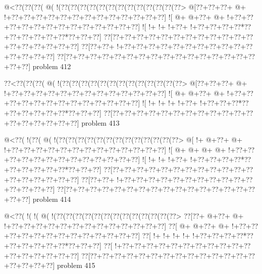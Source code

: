 \vbox{\vbox{\goo
\- @<\0??(\0??(\0??(\- @(\- !(\0??(\0??(\0??(\0??(\0??(\0??(\0??(\0??(\0??(\0??(\0??(\0??(\0??>
\- @[\0??+\0??+\0??+\- @+\- !+\0??+\0??+\0??+\0??+\0??+\0??+\0??+\0??+\0??+\0??+\0??+\0??+\0??]
\- ![\- @+\- @+\0??+\- @+\- !+\0??+\0??+\0??+\0??+\0??+\0??+\0??+\0??+\0??+\0??+\0??+\0??+\0??]
\- ![\- !+\- !+\- !+\0??+\- !+\0??+\0??+\0??+\0??*\0??+\0??+\0??+\0??+\0??+\0??*\0??+\0??+\0??]
\0??[\0??+\0??+\0??+\0??+\0??+\0??+\0??+\0??+\0??+\0??+\0??+\0??+\0??+\0??+\0??+\0??+\0??+\0??]
\0??[\0??+\0??+\- !+\0??+\0??+\0??+\0??+\0??+\0??+\0??+\0??+\0??+\0??+\0??+\0??+\0??+\0??+\0??]
\0??[\0??+\0??+\0??+\0??+\0??+\0??+\0??+\0??+\0??+\0??+\0??+\0??+\0??+\0??+\0??+\0??+\0??+\0??]
}
\hfil problem 412\hfil\break
}



\vbox{\vbox{\goo
\0??<\0??(\0??(\0??(\- @(\- !(\0??(\0??(\0??(\0??(\0??(\0??(\0??(\0??(\0??(\0??(\0??(\0??(\0??>
\- @[\0??+\0??+\0??+\- @+\- !+\0??+\0??+\0??+\0??+\0??+\0??+\0??+\0??+\0??+\0??+\0??+\0??+\0??]
\- ![\- @+\- @+\0??+\- @+\- !+\0??+\0??+\0??+\0??+\0??+\0??+\0??+\0??+\0??+\0??+\0??+\0??+\0??]
\- ![\- !+\- !+\- !+\- !+\0??+\- !+\0??+\0??+\0??*\0??+\0??+\0??+\0??+\0??+\0??*\0??+\0??+\0??]
\0??[\0??+\0??+\0??+\0??+\0??+\0??+\0??+\0??+\0??+\0??+\0??+\0??+\0??+\0??+\0??+\0??+\0??+\0??]
}
\hfil problem 413\hfil\break
}



\vbox{\vbox{\goo
\- @<\0??(\- !(\0??(\- @(\- !(\0??(\0??(\0??(\0??(\0??(\0??(\0??(\0??(\0??(\0??(\0??(\0??(\0??>
\- @[\- !+\- @+\0??+\- @+\- !+\0??+\0??+\0??+\0??+\0??+\0??+\0??+\0??+\0??+\0??+\0??+\0??+\0??]
\- ![\- @+\- @+\- @+\- @+\- !+\0??+\0??+\0??+\0??+\0??+\0??+\0??+\0??+\0??+\0??+\0??+\0??+\0??]
\- ![\- !+\- !+\- !+\0??+\- !+\0??+\0??+\0??+\0??*\0??+\0??+\0??+\0??+\0??+\0??*\0??+\0??+\0??]
\0??[\0??+\0??+\0??+\0??+\0??+\0??+\0??+\0??+\0??+\0??+\0??+\0??+\0??+\0??+\0??+\0??+\0??+\0??]
\0??[\0??+\0??+\- !+\0??+\0??+\0??+\0??+\0??+\0??+\0??+\0??+\0??+\0??+\0??+\0??+\0??+\0??+\0??]
\0??[\0??+\0??+\0??+\0??+\0??+\0??+\0??+\0??+\0??+\0??+\0??+\0??+\0??+\0??+\0??+\0??+\0??+\0??]
}
\hfil problem 414\hfil\break
}



\vbox{\vbox{\goo
\- @<\0??(\- !(\- !(\- @(\- !(\0??(\0??(\0??(\0??(\0??(\0??(\0??(\0??(\0??(\0??(\0??(\0??(\0??>
\0??[\0??+\- @+\0??+\- @+\- !+\0??+\0??+\0??+\0??+\0??+\0??+\0??+\0??+\0??+\0??+\0??+\0??+\0??]
\0??[\- @+\- @+\0??+\- @+\- !+\0??+\0??+\0??+\0??+\0??+\0??+\0??+\0??+\0??+\0??+\0??+\0??+\0??]
\0??[\- !+\- !+\- !+\- !+\- !+\0??+\0??+\0??+\0??*\0??+\0??+\0??+\0??+\0??+\0??*\0??+\0??+\0??]
\0??[\- !+\0??+\0??+\0??+\0??+\0??+\0??+\0??+\0??+\0??+\0??+\0??+\0??+\0??+\0??+\0??+\0??+\0??]
\0??[\0??+\0??+\0??+\0??+\0??+\0??+\0??+\0??+\0??+\0??+\0??+\0??+\0??+\0??+\0??+\0??+\0??+\0??]
}
\hfil problem 415\hfil\break
}



